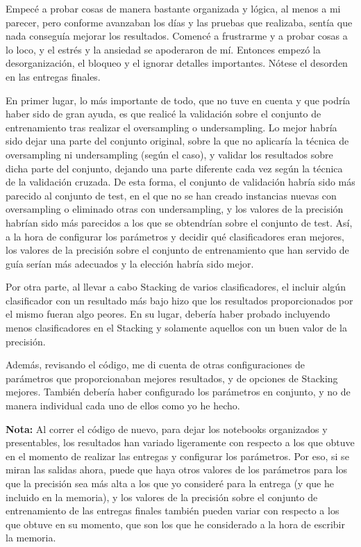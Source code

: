 \documentclass[a4paper,11pt]{article}
\begin{document}
Empecé a probar cosas de manera bastante organizada y lógica, al menos a mi parecer, pero conforme avanzaban los días y las pruebas que realizaba, sentía que nada conseguía mejorar los resultados. Comencé a frustrarme y a probar cosas a lo loco, y el estrés y la ansiedad se apoderaron de mí. Entonces empezó la desorganización, el bloqueo y el ignorar detalles importantes. Nótese el desorden en las entregas finales. 

En primer lugar, lo más importante de todo, que no tuve en cuenta y que podría haber sido de gran ayuda, es que realicé la validación sobre el conjunto de entrenamiento tras realizar el oversampling o undersampling. Lo mejor habría sido dejar una parte del conjunto original, sobre la que no aplicaría la técnica de oversampling ni undersampling (según el caso), y validar los resultados sobre dicha parte del conjunto, dejando una parte diferente cada vez según la técnica de la validación cruzada. De esta forma, el conjunto de validación habría sido más parecido al conjunto de test, en el que no se han creado instancias nuevas con oversampling o eliminado otras con undersampling, y los valores de la precisión habrían sido más parecidos a los que se obtendrían sobre el conjunto de test. Así, a la hora de configurar los parámetros y decidir qué clasificadores eran mejores, los valores de la precisión sobre el conjunto de entrenamiento que han servido de guía serían más adecuados y la elección habría sido mejor. 

Por otra parte, al llevar a cabo Stacking de varios clasificadores, el incluir algún clasificador con un resultado más bajo hizo que los resultados proporcionados por el mismo fueran algo peores. En su lugar, debería haber probado incluyendo menos clasificadores en el Stacking y solamente aquellos con un buen valor de la precisión. 

Además, revisando el código, me di cuenta de otras configuraciones de parámetros que proporcionaban mejores resultados, y de opciones de Stacking mejores. También debería haber configurado los parámetros en conjunto, y no de manera individual cada uno de ellos como yo he hecho. 
 
\textbf{Nota:} Al correr el código de nuevo, para dejar los notebooks organizados y presentables, los resultados han variado ligeramente con respecto a los que obtuve en el momento de realizar las entregas y configurar los parámetros. Por eso, si se miran las salidas ahora, puede que haya otros valores de los parámetros para los que la precisión sea más alta a los que yo consideré para la entrega (y que he incluido en la memoria), y los valores de la precisión sobre el conjunto de entrenamiento de las entregas finales también pueden variar con respecto a los que obtuve en su momento, que son los que he considerado a la hora de escribir la memoria.  
\end{document}
